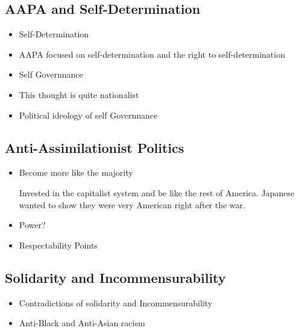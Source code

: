 \documentclass{article}
\begin{document}
\subsection{AAPA and Self-Determination}
\begin{itemize}
  \item Self-Determination
  \item AAPA focused on self-determination and the right to self-determination
  \item Self Governnance
  \item This thought is quite nationalist
  \item Political ideology of self Governnance
\end{itemize}

\subsection{Anti-Assimilationist Politics}
\begin{itemize}
  \item Become more like the majority

    Invested in the capitalist system and be like the rest of America.
    Japanese wanted to show they were very American right after the war.
  \item Power?
    \item Respectability Points
\end{itemize}

\subsection{Solidarity and Incommensurability}
\begin{itemize}
  \item Contradictions of solidarity and Incommensurability
  \item Anti-Black and Anti-Asian racism
\end{itemize}
\end{document}
